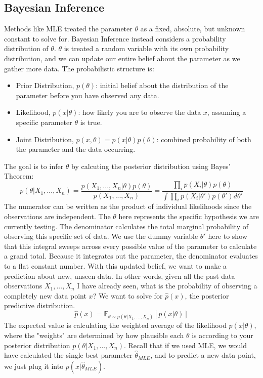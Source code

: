 \documentclass[../Probability.tex]{subfiles}
\begin{document}
\subsection{Bayesian Inference}
Methods like MLE treated the parameter $\theta$ as a fixed, absolute, but unknown constant to solve for.\newline
Bayesian Inference instead considers a probability distribution of $\theta$.
$\theta$ is treated a random variable with its own probability distribution, and we can update our entire belief about the parameter as we gather more data.\newline
The probabilistic structure is:
\begin{itemize}
    \item Prior Distribution, $p(\theta)$: initial belief about the distribution of the parameter before you have observed any data.
    \item Likelihood, $p(x|\theta)$: how likely you are to observe the data $x$, assuming a specific parameter $\theta$ is true.
    \item Joint Distribution, $p(x, \theta) = p(x|\theta)p(\theta)$: combined probability of both the parameter and the data occurring.
\end{itemize}
The goal is to infer $\theta$ by calcuting the posterior distribution using Bayes' Theorem:
$$p(\theta|X_1, ..., X_n) = \frac{p(X_1, ..., X_n|\theta)p(\theta)}{p(X_1, ..., X_n)} = \frac{\prod_i p(X_i|\theta)p(\theta)}{\int \prod_i p(X_i|\theta')p(\theta')d\theta'}$$
The numerator can be written as the product of individual likelihoods since the observations are independent. The $\theta$ here represents the specific hypothesis we are currently testing.\newline
The denominator calculates the total marginal probability of observing this specific set of data. We use the dummy variable $\theta'$ here to show that this integral sweeps across every possible value of the parameter to calculate a grand total. Because it integrates out the parameter, the denominator evaluates to a flat constant number.\newline
With this updated belief, we want to make a prediction about new, unseen data. In other words, given all the past data observations $X_1, ..., X_n$ I have already seen, what is the probability of observing a completely new data point $x$?\newline
We want to solve for $\hat{p}(x)$, the posterior predictive distribution.
$$\hat{p}(x) = \mathbb{E}_{\theta\sim p(\theta|X_1, ..., X_n)}[p(x|\theta)]$$
The expected value is calculating the weighted average of the likelihood $p(x|\theta)$, where the "weights" are determined by how plausible each $\theta$ is according to your posterior distribution $p(\theta|X_1, ..., X_n)$.\newline
Recall that if we used MLE, we would have calculated the single best parameter $\hat{\theta}_{MLE}$, and to predict a new data point, we just plug it into $p(x|\hat{\theta}_{MLE})$.\newline
\end{document}
